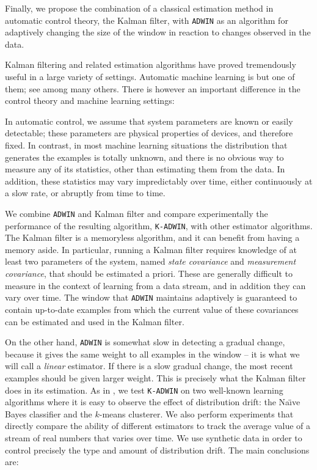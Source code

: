 
Finally, we propose the combination of a classical estimation method
in automatic control theory, the Kalman filter, with 
{\tt ADWIN} as an algorithm for adaptively changing the size of the window in reaction to changes observed in the data. 

Kalman filtering and related estimation algorithms
have proved tremendously useful in a large variety of settings. 
Automatic machine learning is but one of them; 
see  \cite{gama-apneas,jacob-04} among many others. 
There is however an important difference in the 
control theory and machine learning settings: 

In automatic control, we assume that system parameters are known or easily detectable; 
these parameters are physical properties of devices, and therefore fixed. 
In contrast, in most machine learning situations the distribution that generates the examples
is totally unknown, and there is no obvious way to measure any of its statistics, 
other than estimating them from the data. In addition, these statistics 
may vary impredictably over time, either continuously at a slow rate, or abruptly from time to time. 

We combine {\tt ADWIN} and Kalman filter and
compare experimentally the performance of the resulting algorithm, 
{\tt K-ADWIN}, with other estimator algorithms. %
\BEGINOMIT
The Kalman filter is a memoryless algorithm, and it can benefit from having
a memory aside. In particular, running a Kalman filter requires
knowledge of at least two parameters of the system, named
{\em state covariance} and {\em measurement covariance}, that should
be estimated a priori. These are generally difficult to measure in the context
of learning from a data stream, and in addition they can vary over time. 
The window that {\tt ADWIN} maintains adaptively is guaranteed
to contain up-to-date examples from which the current value of
these covariances can be estimated and used in the Kalman filter. 

On the other hand, {\tt ADWIN} is somewhat slow in detecting
a gradual change, because it gives the same weight
to all examples in the window -- it is what we will call a {\em linear}
estimator. If there is a slow gradual change, 
the most recent examples should be given larger weight. This is
precisely what the Kalman filter does in its estimation. 
As in \cite{bif-gav} %
, we test {\tt K-ADWIN} on two well-known learning 
algorithms where it is easy to observe the effect of distribution drift:
the Na\"\i ve Bayes classifier and the $k$-means
clusterer.
 We also perform experiments that directly compare the ability
of different estimators to track the average value of a stream of real numbers
that varies over time. 
We use synthetic data in order to control precisely
the type and amount of distribution drift. The main conclusions are: 


